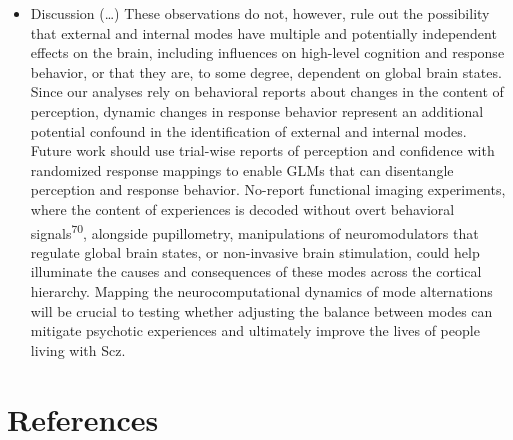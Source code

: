 \documentclass[
]{article}
\providecommand{\tightlist}{%
  \setlength{\itemsep}{0pt}\setlength{\parskip}{0pt}}
\begin{document}
\begin{itemize}
\tightlist
\item
  Discussion (\ldots) These observations do not, however, rule out the
  possibility that external and internal modes have multiple and
  potentially independent effects on the brain, including influences on
  high-level cognition and response behavior, or that they are, to some
  degree, dependent on global brain states. Since our analyses rely on
  behavioral reports about changes in the content of perception, dynamic
  changes in response behavior represent an additional potential
  confound in the identification of external and internal modes. Future
  work should use trial-wise reports of perception and confidence with
  randomized response mappings to enable GLMs that can disentangle
  perception and response behavior. No-report functional imaging
  experiments, where the content of experiences is decoded without overt
  behavioral signals\textsuperscript{70}, alongside pupillometry,
  manipulations of neuromodulators that regulate global brain states, or
  non-invasive brain stimulation, could help illuminate the causes and
  consequences of these modes across the cortical hierarchy. Mapping the
  neurocomputational dynamics of mode alternations will be crucial to
  testing whether adjusting the balance between modes can mitigate
  psychotic experiences and ultimately improve the lives of people
  living with Scz.
\end{itemize}

\newpage

\section*{References}\label{references}
\end{document}
